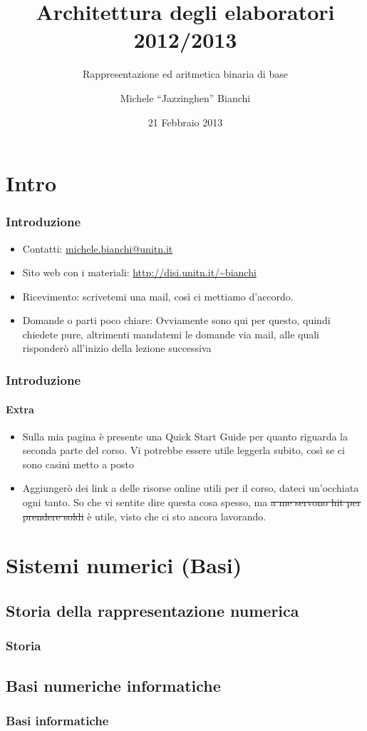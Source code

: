 \documentclass{beamer}
\title[Arch2013] %
{Architettura degli elaboratori 2012/2013}
\subtitle{Rappresentazione ed aritmetica binaria di base}
\author{Michele ``Jazzinghen'' Bianchi\inst{1}}
\institute[DISI] %
{
  \inst{1}%
  Dipartimento di Ingegneria e Scienze dell'Informazione\\
  Universtià degli Studi di Trento
}
\date[FEB 2013] %
{21 Febbraio 2013}
\begin{document}
	\frame{\titlepage}
	\section{Intro}
	\begin{frame}
    \frametitle{Introduzione}
		\begin{itemize}
			\item Contatti: \url{michele.bianchi@unitn.it}
		  \item Sito web con i materiali: \url{http://disi.unitn.it/~bianchi}
		  \item Ricevimento: scrivetemi una mail, così ci mettiamo d'accordo.
		  \item Domande o parti poco chiare: Ovviamente sono qui per questo, quindi
		    chiedete pure, altrimenti mandatemi le domande via mail, alle quali
		    risponderò all'inizio della lezione successiva
		\end{itemize}    
   
  \end{frame}
  \begin{frame}
    \frametitle{Introduzione}
    \framesubtitle{Extra}
    \begin{itemize}
    		\item Sulla mia pagina è presente una Quick Start Guide per quanto riguarda
    			la seconda parte del corso. Vi potrebbe essere utile leggerla subito, così
    			se ci sono casini metto a posto
    		\item Aggiungerò dei link a delle risorse online utili per il corso, dateci
    			un'occhiata ogni tanto. So che vi sentite dire questa cosa spesso, ma \st{a me%
    			servono hit per prendere soldi} è utile, visto che ci sto ancora lavorando.
    \end{itemize}
  \end{frame}

  \section[AllYourBases...]{Sistemi numerici (Basi)}
	\subsection{Storia della rappresentazione numerica}  
  \begin{frame}
    \frametitle{Storia}
  \end{frame}
	
	\subsection{Basi numeriche informatiche}
  \begin{frame}
    \frametitle{Basi informatiche}
  \end{frame}
\end{document}
